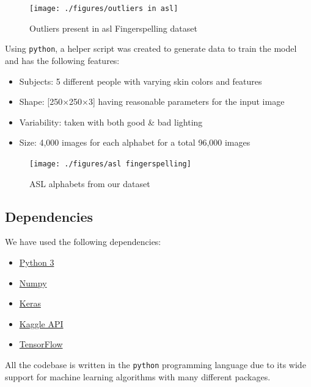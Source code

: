 \documentclass[twocolumn]{article}
\begin{document}
\begin{figure}[h]
\centering
\texttt{[image: ./figures/outliers in asl]}
\caption{Outliers present in \gls{asl} Fingerspelling dataset \cite{pugeault2011spelling}}
\end{figure}

Using \texttt{python}, a helper script was created to generate data to train 
the model and has the following features:
\begin{itemize}
  \item Subjects: 5 different people with varying skin colors and features
  \item Shape: [250×250×3] having reasonable parameters for the input image
  \item Variability: taken with both good \& bad lighting
  \item Size: 4,000 images for each alphabet for a total 96,000 images
\end{itemize}

\begin{figure}[h]
\centering
\texttt{[image: ./figures/asl fingerspelling]}
\caption{ASL alphabets from our dataset}
\end{figure}

\subsection{Dependencies}

We have used the following dependencies:
\begin{itemize}
  \item \href{https://www.python.org/downloads/}{Python 3}
  \item \href{https://www.scipy.org/install.html}{Numpy}
  \item \href{https://keras.io/#installation}{Keras}
  \item \href{https://github.com/Kaggle/kaggle-api}{Kaggle API}
  \item \href{https://www.tensorflow.org/install}{TensorFlow}
\end{itemize}

All the codebase is written in the \texttt{python} programming language due to 
its wide support for machine learning algorithms with many different packages.
\end{document}
